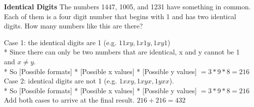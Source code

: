 \question \textbf{Identical Digits}
The numbers 1447, 1005, and 1231 have something in common. Each of them 
is a four digit number that begins with 1 and has two identical digits. 
How many numbers like this are there?
\begin{solution}
Case 1: the identical digits are 1 (e.g. $11xy, 1x1y, 1xy1$) \\*
Since there can only be two numbers that are identical, x and y cannot 
be 1 and $x \neq y$. \\*
So [Possible formats] * [Possible x values] * [Possible y values] $= 
3 * 9 * 8 = 216$ \\
Case 2: identical digits are not 1 (e.g. $1xxy, 1xyx, 1yxx$). \\* So 
[Possible formats] * [Possible x values] * [Possible y values] 
$= 3 * 9 * 8 = 216$ \\
Add both cases to arrive at the final result. $216 + 216 = 432$
\end{solution}